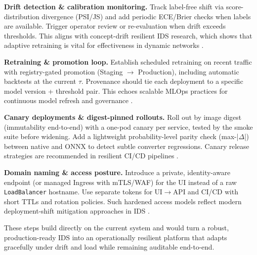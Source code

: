 \documentclass{article}
\begin{document}
\textbf{Drift detection \& calibration monitoring.} Track label-free shift via score-distribution divergence (PSI/JS) and add periodic ECE/Brier checks when labels are available. Trigger operator review or re-evaluation when drift exceeds thresholds. This aligns with concept-drift resilient IDS research, which shows that adaptive retraining is vital for effectiveness in dynamic networks \cite{andresini2021, alsuwat2023}.

\textbf{Retraining \& promotion loop.} Establish scheduled retraining on recent traffic with registry-gated promotion (Staging $\to$ Production), including automatic backtests at the current $\tau$. Provenance should tie each deployment to a specific model version + threshold pair. This echoes scalable MLOps practices for continuous model refresh and governance \cite{vijayan2024}.

\textbf{Canary deployments \& digest-pinned rollouts.} Roll out by image digest (immutability end-to-end) with a one-pod canary per service, tested by the smoke suite before widening. Add a lightweight probability-level parity check (max-|$ \Delta$|) between native and ONNX to detect subtle converter regressions. Canary release strategies are recommended in resilient CI/CD pipelines \cite{jana2022}.

\textbf{Domain naming \& access posture.} Introduce a private, identity-aware endpoint (or managed Ingress with mTLS/WAF) for the UI instead of a raw \texttt{LoadBalancer} hostname. Use separate tokens for UI$\to$API and CI/CD with short TTLs and rotation policies. Such hardened access models reflect modern deployment-shift mitigation approaches in IDS \cite{pawlicki2022}.

These steps build directly on the current system and would turn a robust, production-ready IDS into an operationally resilient platform that adapts gracefully under drift and load while remaining auditable end-to-end.

\end{document}
